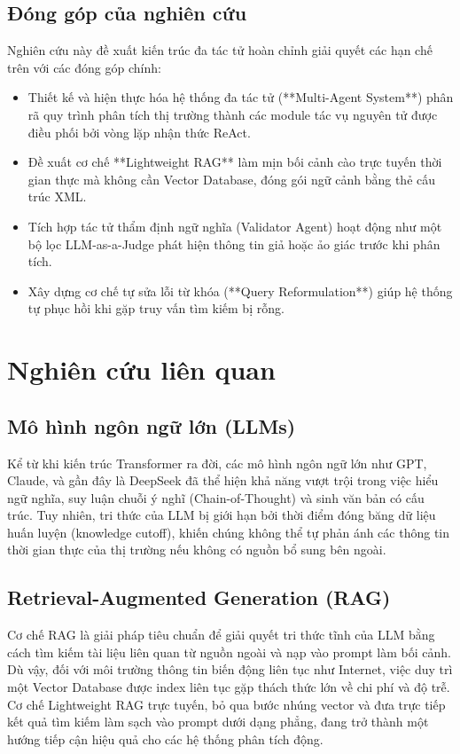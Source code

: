 \documentclass[11pt,a4paper]{article}
\begin{document}
\subsection{Đóng góp của nghiên cứu}
Nghiên cứu này đề xuất kiến trúc đa tác tử hoàn chỉnh giải quyết các hạn chế trên với các đóng góp chính:
\begin{itemize}
    \item Thiết kế và hiện thực hóa hệ thống đa tác tử (**Multi-Agent System**) phân rã quy trình phân tích thị trường thành các module tác vụ nguyên tử được điều phối bởi vòng lặp nhận thức ReAct.
    \item Đề xuất cơ chế **Lightweight RAG** làm mịn bối cảnh cào trực tuyến thời gian thực mà không cần Vector Database, đóng gói ngữ cảnh bằng thẻ cấu trúc XML.
    \item Tích hợp tác tử thẩm định ngữ nghĩa (Validator Agent) hoạt động như một bộ lọc LLM-as-a-Judge phát hiện thông tin giả hoặc ảo giác trước khi phân tích.
    \item Xây dựng cơ chế tự sửa lỗi từ khóa (**Query Reformulation**) giúp hệ thống tự phục hồi khi gặp truy vấn tìm kiếm bị rỗng.
\end{itemize}



\section{Nghiên cứu liên quan}

\subsection{Mô hình ngôn ngữ lớn (LLMs)}
Kể từ khi kiến trúc Transformer ra đời, các mô hình ngôn ngữ lớn như GPT, Claude, và gần đây là DeepSeek đã thể hiện khả năng vượt trội trong việc hiểu ngữ nghĩa, suy luận chuỗi ý nghĩ (Chain-of-Thought) và sinh văn bản có cấu trúc. Tuy nhiên, tri thức của LLM bị giới hạn bởi thời điểm đóng băng dữ liệu huấn luyện (knowledge cutoff), khiến chúng không thể tự phản ánh các thông tin thời gian thực của thị trường nếu không có nguồn bổ sung bên ngoài.

\subsection{Retrieval-Augmented Generation (RAG)}
Cơ chế RAG là giải pháp tiêu chuẩn để giải quyết tri thức tĩnh của LLM bằng cách tìm kiếm tài liệu liên quan từ nguồn ngoài và nạp vào prompt làm bối cảnh. Dù vậy, đối với môi trường thông tin biến động liên tục như Internet, việc duy trì một Vector Database được index liên tục gặp thách thức lớn về chi phí và độ trễ. Cơ chế Lightweight RAG trực tuyến, bỏ qua bước nhúng vector và đưa trực tiếp kết quả tìm kiếm làm sạch vào prompt dưới dạng phẳng, đang trở thành một hướng tiếp cận hiệu quả cho các hệ thống phân tích động.
\end{document}
